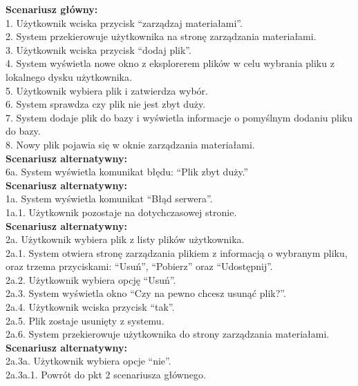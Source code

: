 \textbf{Scenariusz główny:}\\
1. Użytkownik wciska przycisk “zarządzaj materiałami”.\\
2. System przekierowuje użytkownika na stronę zarządzania materiałami.\\
3. Użytkownik wciska przycisk “dodaj plik”.\\
4. System wyświetla nowe okno z eksplorerem plików w celu wybrania pliku z
lokalnego dysku użytkownika.\\
5. Użytkownik wybiera plik i zatwierdza wybór.\\
6. System sprawdza czy plik nie jest zbyt duży.\\
7. System dodaje plik do bazy i wyświetla informacje o pomyślnym dodaniu pliku do
bazy.\\
8. Nowy plik pojawia się w oknie zarządzania materiałami.\\
\textbf{Scenariusz alternatywny:}\\
6a. System wyświetla komunikat błędu: “Plik zbyt duży.”\\
\textbf{Scenariusz alternatywny:}\\
1a. System wyświetla komunikat “Błąd serwera”.\\
1a.1. Użytkownik pozostaje na dotychczasowej stronie.\\
\textbf{Scenariusz alternatywny:}\\
2a. Użytkownik wybiera plik z listy plików użytkownika.\\
2a.1. System otwiera stronę zarządzania plikiem z informacją o wybranym pliku, oraz trzema
przyciskami: “Usuń”, “Pobierz” oraz “Udostępnij”.\\
2a.2. Użytkownik wybiera opcję “Usuń”.\\
2a.3. System wyświetla okno “Czy na pewno chcesz usunąć plik?”.\\
2a.4. Użytkownik wciska przycisk “tak”.\\
2a.5. Plik zostaje usunięty z systemu.\\
2a.6. System przekierowuje użytkownika do strony zarządzania materiałami.\\
\textbf{Scenariusz alternatywny:}\\
2a.3a. Użytkownik wybiera opcje “nie”.\\
2a.3a.1. Powrót do pkt 2 scenariusza głównego.\\

